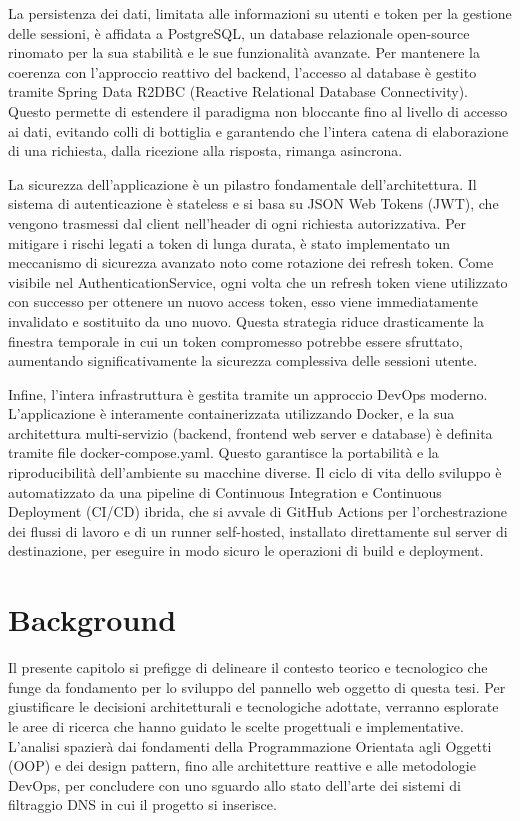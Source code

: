 \documentclass[12pt,a4paper,openright,twoside]{book}
\begin{document}
La persistenza dei dati, limitata alle informazioni su utenti e token per la gestione delle sessioni, è affidata a PostgreSQL, un database relazionale open-source rinomato per la sua stabilità e le sue funzionalità avanzate. Per mantenere la coerenza con l'approccio reattivo del backend, l'accesso al database è gestito tramite Spring Data R2DBC (Reactive Relational Database Connectivity). Questo permette di estendere il paradigma non bloccante fino al livello di accesso ai dati, evitando colli di bottiglia e garantendo che l'intera catena di elaborazione di una richiesta, dalla ricezione alla risposta, rimanga asincrona.

La sicurezza dell'applicazione è un pilastro fondamentale dell'architettura. Il sistema di autenticazione è stateless e si basa su JSON Web Tokens (JWT), che vengono trasmessi dal client nell'header di ogni richiesta autorizzativa. Per mitigare i rischi legati a token di lunga durata, è stato implementato un meccanismo di sicurezza avanzato noto come rotazione dei refresh token. Come visibile nel AuthenticationService, ogni volta che un refresh token viene utilizzato con successo per ottenere un nuovo access token, esso viene immediatamente invalidato e sostituito da uno nuovo. Questa strategia riduce drasticamente la finestra temporale in cui un token compromesso potrebbe essere sfruttato, aumentando significativamente la sicurezza complessiva delle sessioni utente.

Infine, l'intera infrastruttura è gestita tramite un approccio DevOps moderno. L'applicazione è interamente containerizzata utilizzando Docker, e la sua architettura multi-servizio (backend, frontend web server e database) è definita tramite file docker-compose.yaml. Questo garantisce la portabilità e la riproducibilità dell'ambiente su macchine diverse. Il ciclo di vita dello sviluppo è automatizzato da una pipeline di Continuous Integration e Continuous Deployment (CI/CD) ibrida, che si avvale di GitHub Actions per l'orchestrazione dei flussi di lavoro e di un runner self-hosted, installato direttamente sul server di destinazione, per eseguire in modo sicuro le operazioni di build e deployment.

\chapter{Background}
\label{chap:background}

Il presente capitolo si prefigge di delineare il contesto teorico e tecnologico che funge da fondamento per lo sviluppo del pannello web oggetto di questa tesi.  Per giustificare le decisioni architetturali e tecnologiche adottate, verranno esplorate le aree di ricerca che hanno guidato le scelte progettuali e implementative.  L'analisi spazierà dai fondamenti della Programmazione Orientata agli Oggetti (OOP) e dei design pattern, fino alle architetture reattive e alle metodologie DevOps, per concludere con uno sguardo allo stato dell'arte dei sistemi di filtraggio DNS in cui il progetto si inserisce.
\end{document}
